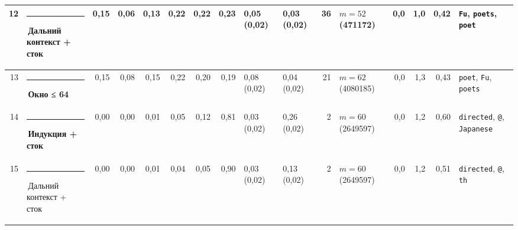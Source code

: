 \documentclass[10pt]{article}
\begin{document}
\begin{minipage}{\linewidth}
\begin{center}
{\begin{tabular}{|r|l|r|r|r|r|r|r|l|l|r|l|r|r|r|l|}
12 & \textcolor[HTML]{C3C2B7}{\rule{0.62em}{0.62em}}\,Дальний контекст + сток & 0,15 & 0,06 & 0,13 & 0,22 & 0,22 & 0,23 & 0,05 (0,02) & 0,03 (0,02) & 36 & $m{=}52$ (471172) & 0,0 & 1,0 & 0,42 & \texttt{\textvisiblespace{}Fu}, \texttt{\textvisiblespace{}poets}, \texttt{\textvisiblespace{}poet} \\ \hline
13 & \textcolor[HTML]{EDA100}{\rule{0.62em}{0.62em}}\,\textbf{Окно ≤ 64} & 0,15 & 0,08 & 0,15 & 0,22 & 0,20 & 0,19 & 0,08 (0,02) & 0,04 (0,02) & 21 & $m{=}62$ (4080185) & 0,0 & 1,3 & 0,43 & \texttt{\textvisiblespace{}poet}, \texttt{\textvisiblespace{}Fu}, \texttt{\textvisiblespace{}poets} \\ \hline
14 & \textcolor[HTML]{008300}{\rule{0.62em}{0.62em}}\,\textbf{Индукция + сток} & 0,00 & 0,00 & 0,01 & 0,05 & 0,12 & 0,81 & 0,03 (0,02) & 0,26 (0,02) & 2 & $m{=}60$ (2649597) & 0,0 & 1,2 & 0,60 & \texttt{\textvisiblespace{}directed}, \texttt{\textvisiblespace{}@}, \texttt{\textvisiblespace{}Japanese} \\ \hline
15 & \textcolor[HTML]{C3C2B7}{\rule{0.62em}{0.62em}}\,Дальний контекст + сток & 0,00 & 0,00 & 0,01 & 0,04 & 0,05 & 0,90 & 0,03 (0,02) & 0,13 (0,02) & 2 & $m{=}60$ (2649597) & 0,0 & 1,2 & 0,51 & \texttt{\textvisiblespace{}directed}, \texttt{\textvisiblespace{}@}, \texttt{th} \\ \hline
\hline\end{tabular}}\end{center}
\end{minipage}
\par\vspace{0.4em}
\end{document}
